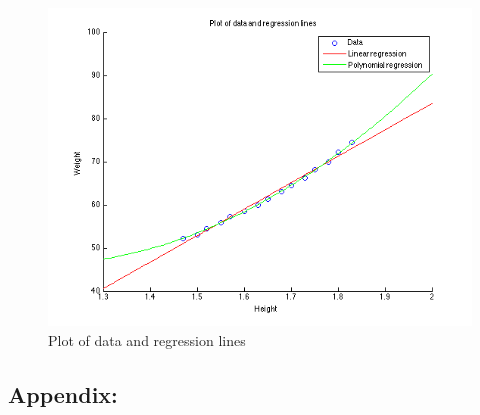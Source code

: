 \documentclass[a4paper]{article}
\begin{document}
	\begin{figure}[H]
		\centering
		\includegraphics[scale=.57]{images/regression.png}
		\caption{Plot of data and regression lines}
		\label{fig:regression}
	\end{figure}
\newpage
\subsection*{Appendix:}
	
	
	
\end{document}
